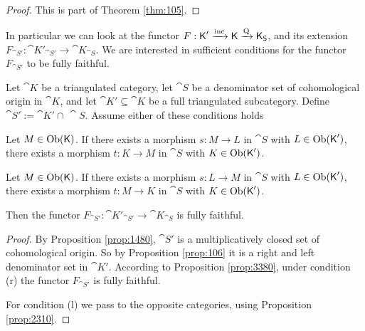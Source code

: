 \begin{proof}
This is part of Theorem \ref{thm:105}. 
\end{proof}

In particular we can look at the functor  
$F : \operatorname{\mathsf{K}}' \xrightarrow{\operatorname{inc}} \operatorname{\mathsf{K}} \xrightarrow{\operatorname{Q}} \operatorname{\mathsf{K}}_{\operatorname{\mathsf{S}}}$, 
and its extension 
$F_{\cat{S}'} : \cat{K}'_{\cat{S}'} \to \cat{K}_{\cat{S}}$.
We are interested in sufficient conditions for the functor 
$F_{\cat{S}'}$ to be fully faithful.

\begin{prop} \label{prop:1320}  
Let $\cat{K}$ be a triangulated category, let 
$\cat{S}$ be a denominator set of cohomological origin in $\cat{K}$,
and let $\cat{K}' \subseteq \cat{K}$ be a full triangulated subcategory.  
Define 
$\cat{S}' := \cat{K}' \cap \, \cat{S}$. 
Assume either of these conditions holds\tup{:}
\begin{itemize}
 Let $M \in \operatorname{Ob}(\operatorname{\mathsf{K}})$. If 
there exists a morphism $s : M \to L$ in $\cat{S}$ with 
$L \in \operatorname{Ob}(\operatorname{\mathsf{K}}')$, 
there exists a morphism $t : K \to M$ in $\cat{S}$ with 
$K \in \operatorname{Ob}(\operatorname{\mathsf{K}}')$.

 Let $M \in \operatorname{Ob}(\operatorname{\mathsf{K}})$. If 
there exists a morphism $s : L \to M$ in $\cat{S}$ with 
$L \in \operatorname{Ob}(\operatorname{\mathsf{K}}')$, 
there exists a morphism $t : M \to K$ in $\cat{S}$ with 
$K \in \operatorname{Ob}(\operatorname{\mathsf{K}}')$.
\end{itemize}
Then the functor 
$F_{\cat{S}'} : \cat{K}'_{\cat{S}'} \to \cat{K}_{\cat{S}}$ 
is fully faithful.
\end{prop}

\begin{proof}
By  Proposition \ref{prop:1480}, $\cat{S}'$ is a multiplicatively closed 
set of cohomological origin. So by Proposition \ref{prop:106}
it is a right and left denominator set in $\cat{K}'$. 
According to Proposition \ref{prop:3380}, under condition (r) the functor 
$F_{\cat{S}'}$ is  fully faithful.

For condition (l) we pass to the opposite categories, using Proposition 
\ref{prop:2310}. 
\end{proof}

